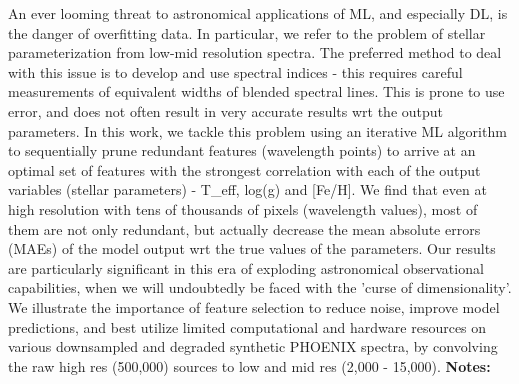 \documentclass{report}
\begin{document}
{{{{{{{{{{{{{{{{{{{{{{{{{{{{{{{{{{{{{{{{{{{{{{{{{{{{{{{{{{{{{{{{An ever looming threat to astronomical applications of ML, and especially DL, is the danger of overfitting data. In particular, we refer to the problem of stellar parameterization from low-mid resolution spectra. The preferred method to deal with this issue is to develop and use spectral indices - this requires careful measurements of equivalent widths of blended spectral lines. This is prone to use error, and does not often result in very accurate results wrt the output parameters. In this work, we tackle this problem using an iterative ML algorithm to sequentially prune redundant features (wavelength points) to arrive at an optimal set of features with the strongest correlation with each of the output variables (stellar parameters) - T\_eff, log(g) and [Fe/H]. We find that even at high resolution with tens of thousands of pixels (wavelength values), most of them are not only redundant, but actually decrease the mean absolute errors (MAEs) of the model output wrt the true values of the parameters. Our results are particularly significant in this era of exploding astronomical observational capabilities, when we will undoubtedly be faced with the 'curse of dimensionality'. We illustrate the importance of feature selection to reduce noise, improve model predictions, and best utilize limited computational and hardware resources on various downsampled and degraded synthetic PHOENIX spectra, by convolving the raw high res (500,000) sources to low and mid res (2,000 - 15,000).\newline
{\bf Notes:}\newline
{\newpage
}}}}}}}}}}}}}}}}}}}}}}}}}}}}}}}}}}}}}}}}}}}}}}}}}}}}}}}}}}}}}}}}}
\end{document}
